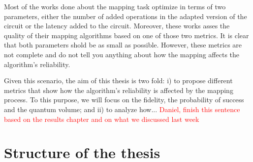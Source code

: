 Most of the works done about the mapping task optimize in terms of two parameters, either the number of added operations in the adapted version of the circuit or the latency added to the circuit. Moreover, these works asses the quality of their mapping algorithms based on one of those two metrics. It is clear that both parameters shold be as small as possible. However, these metrics are not complete and do not tell you anything about how the mapping affects the algorithm's reliability.

Given this scenario, the aim of this thesis is two fold: i) to propose different metrics that show how the algorithm's reliability is affected by the mapping process. To this purpose, we will focus on the fidelity, the probability of success and the quantum volume; and ii) to analyze how... \textcolor{red}{Daniel, finish this sentence based on the results chapter and on what we discussed last week}

\section{Structure of the thesis}
\label{sec:org2a9c2ee}
